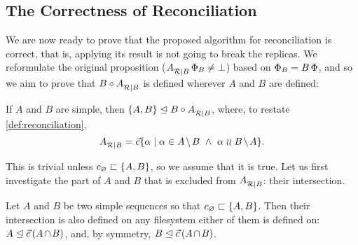 
\subsection{The Correctness of Reconciliation}

We are now ready to prove that the proposed algorithm for reconciliation is correct,
that is, applying its result is not going to break the replicas.
We reformulate the original proposition (${A}^{}_{\mathcal{R}|{B}}\,\Phi_B\neq\bot$)
based on $\Phi_B=B\,\Phi$, and so we aim to prove that
$B\circ{A}^{}_{\mathcal{R}|{B}}$ is defined wherever $A$ and $B$ are defined:

\begin{myth}\label{reconciliation_correct}
If $A$ and $B$ are simple, then ${\{{A,B}\}}\trianglelefteq{B\circ{A}^{}_{\mathcal{R}|{B}}}$,
where, to restate \cref{def:reconciliation},
\[ \reca = \ords{\alpha \whr \alpha\in \ambnp  \ \wedge\   \alpha\indep \bmanp }. \]
\end{myth}

This is trivial unless $c_\varnothing\sqsubset{\{{A,B}\}}$, so we assume that it is true.
Let us first investigate the part of $A$ and $B$ that is excluded from
${A}^{}_{\mathcal{R}|{B}}$: their intersection.

\begin{mylem}\label{can_move_intersection}
Let $A$ and $B$ be two simple sequences so that $c_\varnothing\sqsubset{\{{A, B}\}}$.
Then their intersection is also defined on any filesystem
either of them is defined on:
$\worksm{A}{\acb}$, and, by symmetry,
$\worksm{B}{\acb}$.
\end{mylem}

